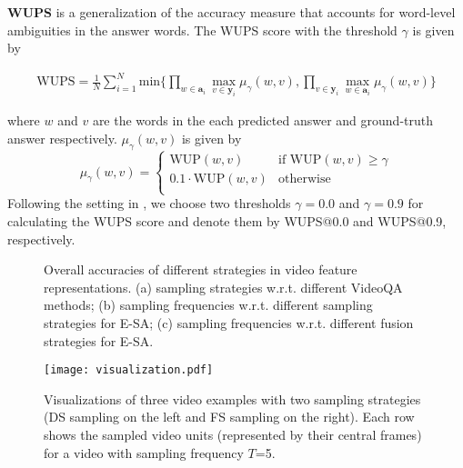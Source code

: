 \documentclass[letterpaper]{article} \usepackage{aaai19}  \usepackage{times}  \usepackage{helvet}  \usepackage{courier}  \usepackage{url}  \usepackage{graphicx}  \usepackage{amsfonts}
\begin{document}
\textbf{WUPS} is a generalization of the accuracy measure that accounts for word-level ambiguities in the answer words. The WUPS score with the threshold $\gamma$ is given by
\begin{small}
\begin{equation}
\begin{array}{rcl}
\textrm{WUPS} = \frac{1}{N}\sum\limits_{i=1}^N\textrm{min}\{\prod\limits_{w\in \mathbf{a}_i}\mathop{\mathrm{max}}\limits_{v\in \mathbf{y}_i}\mu_{\gamma}(w,v),
\prod\limits_{v\in \mathbf{y}_i}\mathop{\mathrm{max}}\limits_{w\in \mathbf{a}_i}\mu_{\gamma}(w,v)\}
\end{array}
\end{equation}
\end{small}
where $w$ and $v$ are the words in the each predicted answer and ground-truth answer respectively. $\mu_{\gamma}(w,v)$ is given by
\begin{equation}
\mu_{\gamma}(w,v)=\left\{
\begin{array}{rcl}
\mathrm{WUP}(w,v) & \textrm{if~}\mathrm{WUP}(w,v) \geq \gamma \\
0.1\cdot \mathrm{WUP}(w,v) & \textrm{otherwise}\\
\end{array}
\right.
\end{equation}
Following the setting in \cite{malinowski2015ask}, we choose two thresholds $\gamma=0.0$ and $\gamma=0.9$ for calculating the WUPS score and denote them by WUPS@0.0 and WUPS@0.9, respectively.

\begin{figure*}
\centering
{}
\caption{Overall accuracies of different strategies in video feature representations. (a) sampling strategies w.r.t. different VideoQA methods; (b) sampling frequencies w.r.t. different sampling strategies for E-SA; (c) sampling frequencies w.r.t. different fusion strategies for E-SA.}
\label{fig:ablation}
\vspace{-10pt}
\end{figure*}

\begin{figure*}
\centering
\texttt{[image: visualization.pdf]}
\caption{Visualizations of three video examples with two sampling strategies (DS sampling on the left and FS sampling on the right). Each row shows the sampled video units (represented by their central frames) for a video with sampling frequency $T$=5.}
\label{fig:vis_sampling}
\vspace{-10pt}
\end{figure*}
\end{document}
